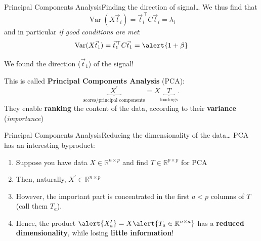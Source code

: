 \begin{frame}{Principal Components Analysis}{Finding the direction of signal\dots}
    We thus find that
    \begin{equation*}
        \operatorname{Var}(X \vec{t}_i)
        =
        \vec{t}_i^{\,\top} C \vec{t}_i
        =
        \lambda_i
    \end{equation*}
    and in particular \emph{if good conditions are met}:
    \begin{equation*}
        \operatorname{Var}(X \vec{t}_1)
        =
        \vec{t}_1^{\,\top} C \vec{t}_1
        =
        \alert{1 + \beta}
    \end{equation*}

    \vfill \pause

    \begin{center}
        \huge
        We found the direction ($\vec{t}_1$) of the signal!
    \end{center}

    \vfill \pause

    This is called \textbf{Principal Components Analysis} (PCA):
    \begin{equation*}
        \underbrace{~~X^{\prime}~~}_{\text{scores/principal components}} = X \underbrace{~~T~~}_{\text{loadings}}.
    \end{equation*}
    They enable \textbf{ranking} the content of the data, according to their \textbf{variance} (\emph{importance})
\end{frame}

\begin{frame}{Principal Components Analysis}{Reducing the dimensionality of the data\dots}
    PCA has an interesting byproduct:
    \begin{center}
        
    \end{center}
    \begin{enumerate}
        \item<1-> Suppose you have data $X \in \mathbb{R}^{n \times p}$ and find $T \in \mathbb{R}^{p \times p}$ for PCA
        \item<2-> Then, naturally, $X^{\prime} \in \mathbb{R}^{n \times p}$
        \item<3-> However, the important part is concentrated in the first $a < p$ columns of $T$ (call them $T_a$).
        \item<4-> Hence, the product $\alert{X^{\prime}_a} = X \alert{T_a \in \mathbb{R}^{n \times a}}$ has a \textbf{reduced dimensionality}, while losing \textbf{little information}!
    \end{enumerate}
\end{frame}

